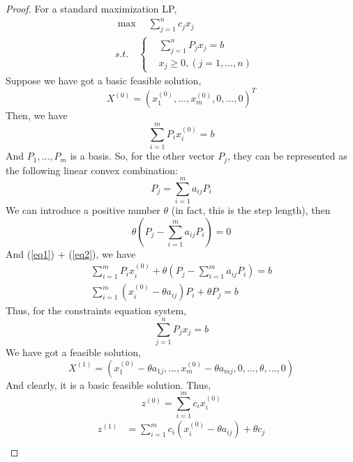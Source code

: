 \documentclass{article}
\begin{document}
\begin{proof}
	For a standard maximization LP,
	\begin{align}
		& \max \quad \sum_{j=1}^{n} c_jx_j \\
		& s.t. \quad \left\{
		\begin{aligned}
			& \sum_{j=1}^{n} P_j x_j = b \\
			& x_j \geq 0, (j = 1, ..., n)
		\end{aligned} \right.
	\end{align}
	Suppose we have got a basic feasible solution,
	\begin{equation}
		X^{(0)} = (x_1^{(0)}, ..., x_m^{(0)}, 0, ..., 0)^T
	\end{equation}
	Then, we have
	\begin{equation}
		\sum_{i=1}^m P_i x_i^{(0)} = b \label{eq1}
	\end{equation}
	And $P_1, ..., P_m$ is a basis. So, for the other vector $P_j$, they can be represented as the following linear convex combination:
	\begin{equation}
		P_j  = \sum_{i=1}^{m} a_{ij}P_i
	\end{equation}  
	We can introduce a positive number $\theta$ (in fact, this is the step length), then
	\begin{equation}
		\theta(P_j - \sum_{i=1}^{m}a_{ij}P_i) = 0 \label{eq2}
	\end{equation}
	And (\ref{eq1}) + (\ref{eq2}), we have
	\begin{align}
		\sum_{i=1}^{m} P_i x_i^{(0)} + \theta(P_j - \sum_{i=1}^{m} a_{ij}P_i) = b \\
		\sum_{i=1}^{m}(x_i^{(0)} - \theta a_{ij}) P_i + \theta P_j = b
	\end{align}
	Thus, for the constraints equation system,
	\begin{equation}
		\sum_{j=1}^{n} P_j x_j = b
	\end{equation} 
	We have got a feasible solution,
	\begin{equation}
		X^{(1)} = (x_1^{(0)} - \theta a_{1j}, ..., x_m^{(0)} - \theta a_{mj}, 0, ..., \theta, ..., 0)
	\end{equation}	
	And clearly, it is a basic feasible solution. Thus, 
	\begin{equation}
		z^{(0)} = \sum_{i=1}^{m} c_i x_i^{(0)}
	\end{equation}
	\begin{align}
		z^{(1)} & = \sum_{i=1}^{m} c_i (x_i^{(0)} - \theta a_{ij}) + \theta c_j \\

\end{align}
\end{proof}
\end{document}
